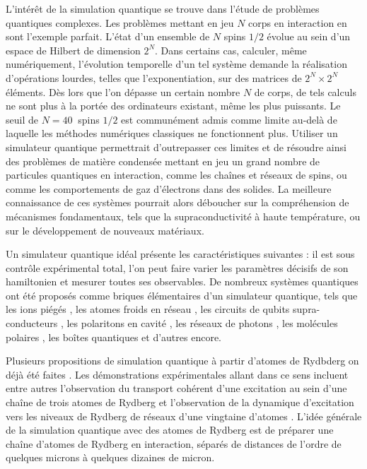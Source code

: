 L'intérêt de la simulation quantique se trouve dans l'étude de problèmes quantiques complexes.
Les problèmes mettant en jeu $N$ corps en interaction en sont l'exemple parfait.
L'état d'un ensemble de $N$ spins $1/2$ évolue au sein d'un espace de Hilbert de dimension $2^N$.
Dans certains cas, calculer, même numériquement, l'évolution temporelle d'un tel système demande la réalisation d'opérations lourdes, telles que l'exponentiation, sur des matrices de $2^N \times 2^N$ éléments.
Dès lors que l'on dépasse un certain nombre $N$ de corps, de tels calculs ne sont plus à la portée des ordinateurs existant, même les plus puissants.
Le seuil de $N=\SI{40}{}$ spins $1/2$ est communément admis \cite{Cirac2003,Friedenauer2008,Lloyd1996,Raedt2007} comme limite au-delà de laquelle les méthodes numériques classiques ne fonctionnent plus.
Utiliser un simulateur quantique permettrait d'outrepasser ces limites et de résoudre ainsi des problèmes de matière condensée mettant en jeu un grand nombre de particules quantiques en interaction, comme les chaînes et réseaux de spins, ou comme les comportements de gaz d'électrons dans des solides.
La meilleure connaissance de ces systèmes pourrait alors déboucher sur la compréhension de mécanismes fondamentaux, tels que la supraconductivité à haute température, ou sur le développement de nouveaux matériaux.

Un simulateur quantique idéal présente les caractéristiques suivantes : il est sous contrôle expérimental total, l'on peut faire varier les paramètres décisifs de son hamiltonien et mesurer toutes ses observables.
De nombreux systèmes quantiques ont été proposés comme briques élémentaires d'un simulateur quantique, tels que les ions piégés \cite{Blatt2012,Schneider2012}, les atomes froids en réseau \cite{Jaksch2005,Lewenstein2007,Bloch2012,Bloch2008}, les circuits de qubits supra-conducteurs \cite{Houck2012}, les polaritons en cavité \cite{Tanese2014}, les réseaux de photons \cite{Aspuru-Guzik2012,Carusotto2013}, les molécules polaires \cite{Buechler2009}, les boîtes  quantiques \cite{Cai2013,Manousakis2002,Byrnes2007} et d'autres encore.

\bigskip

Plusieurs propositions de simulation quantique à partir d'atomes de Rydbderg on déjà été faites \cite{SchAPnleber2015,Lesanovsky2012,Dauphin2012,Hague2013}.
Les démonstrations expérimentales allant dans ce sens incluent entre autres l'observation du transport cohérent d'une excitation au sein d'une chaîne de trois atomes de Rydberg \cite{Barredo2015} et l'observation de la dynamique d'excitation vers les niveaux de Rydberg de réseaux d'une vingtaine d'atomes \cite{Labuhn2016}.
L'idée générale de la simulation quantique avec des atomes de Rydberg est de préparer une chaîne d'atomes de Rydberg en interaction, séparés de distances de l'ordre de quelques microns à quelques dizaines de micron.

